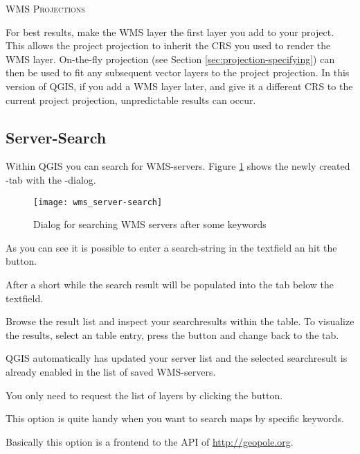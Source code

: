 \begin{Tip}[ht]\caption{\textsc{WMS Projections}}
For best results, make the WMS layer the first layer
you add to your project.  This allows the project
projection to inherit the CRS you used to render the WMS layer.
On-the-fly projection (see Section \ref{sec:projection-specifying})
can then be used to fit any subsequent
vector layers to the project projection.
In this version of QGIS, if you add a WMS layer later, and give it a different
CRS to the current project projection, unpredictable
results can occur.
\end{Tip}

%
%
\subsection{Server-Search}
\label{sec:serversearch}

Within QGIS you can search for WMS-servers. Figure \ref{fig:searchtab} shows
the newly created -tab with the -dialog.

\begin{figure}[ht]
  \centering
  \texttt{[image: wms\_server-search]}
  	\caption{Dialog for searching WMS servers after some keywords \nixcaption}\label{fig:searchtab}
\end{figure}

As you can see it is possible to enter a search-string in the textfield an
hit the  button.

After a short while the search result will be populated into the tab below
the textfield.

Browse the result list and inspect your searchresults within the table. To
visualize the results, select an table entry, press the  button and change back to the  tab.

QGIS automatically has updated your server list and the selected
searchresult is already enabled in the list of saved WMS-servers.

You only need to request the list of layers by clicking the
 button.

This option is quite handy when you want to search maps by specific
keywords.

Basically this option is a frontend to the API of
\url{http://geopole.org}.

%
%
